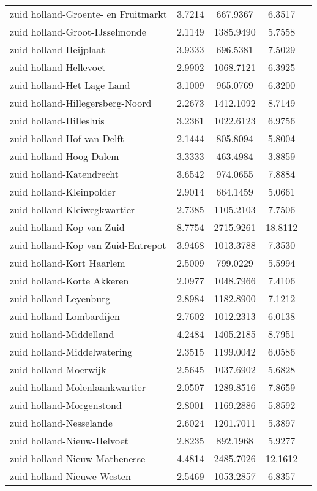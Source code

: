 \begin{longtable}{llccc}
zuid holland-Groente- en Fruitmarkt & 3.7214 & 667.9367 & 6.3517 \\
zuid holland-Groot-IJsselmonde & 2.1149 & 1385.9490 & 5.7558 \\
zuid holland-Heijplaat & 3.9333 & 696.5381 & 7.5029 \\
zuid holland-Hellevoet & 2.9902 & 1068.7121 & 6.3925 \\
zuid holland-Het Lage Land & 3.1009 & 965.0769 & 6.3200 \\
zuid holland-Hillegersberg-Noord & 2.2673 & 1412.1092 & 8.7149 \\
zuid holland-Hillesluis & 3.2361 & 1022.6123 & 6.9756 \\
zuid holland-Hof van Delft & 2.1444 & 805.8094 & 5.8004 \\
zuid holland-Hoog Dalem & 3.3333 & 463.4984 & 3.8859 \\
zuid holland-Katendrecht & 3.6542 & 974.0655 & 7.8884 \\
zuid holland-Kleinpolder & 2.9014 & 664.1459 & 5.0661 \\
zuid holland-Kleiwegkwartier & 2.7385 & 1105.2103 & 7.7506 \\
zuid holland-Kop van Zuid & 8.7754 & 2715.9261 & 18.8112 \\
zuid holland-Kop van Zuid-Entrepot & 3.9468 & 1013.3788 & 7.3530 \\
zuid holland-Kort Haarlem & 2.5009 & 799.0229 & 5.5994 \\
zuid holland-Korte Akkeren & 2.0977 & 1048.7966 & 7.4106 \\
zuid holland-Leyenburg & 2.8984 & 1182.8900 & 7.1212 \\
zuid holland-Lombardijen & 2.7602 & 1012.2313 & 6.0138 \\
zuid holland-Middelland & 4.2484 & 1405.2185 & 8.7951 \\
zuid holland-Middelwatering & 2.3515 & 1199.0042 & 6.0586 \\
zuid holland-Moerwijk & 2.5645 & 1037.6902 & 5.6828 \\
zuid holland-Molenlaankwartier & 2.0507 & 1289.8516 & 7.8659 \\
zuid holland-Morgenstond & 2.8001 & 1169.2886 & 5.8592 \\
zuid holland-Nesselande & 2.6024 & 1201.7011 & 5.3897 \\
zuid holland-Nieuw-Helvoet & 2.8235 & 892.1968 & 5.9277 \\
zuid holland-Nieuw-Mathenesse & 4.4814 & 2485.7026 & 12.1612 \\
zuid holland-Nieuwe Westen & 2.5469 & 1053.2857 & 6.8357 \\

\end{longtable}
